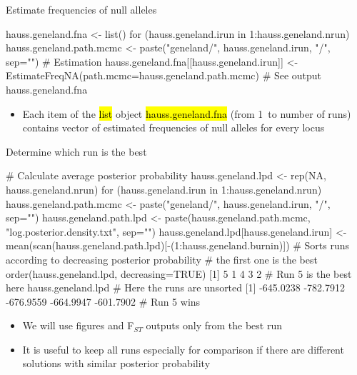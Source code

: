 \documentclass[compress, ucs, xelatex, 11pt, xcolor=svgnames,
	hyperref={
		bookmarks=true,
		unicode=true,
		colorlinks=true,
		pdftitle={Molecular data in R},
		plainpages=false,
		pdfauthor={Vojtech Zeisek},
		pdfsubject={Course about phylogeny and evolution in R},
		pdfcreator={XeLaTeX},
		pdfkeywords={R, evolution, phylogeny, molecular data},
		linkcolor=Tomato,
		anchorcolor=SaddleBrown,
		citecolor=Goldenrod,
		filecolor=DarkMagenta,
		menucolor=Sienna,
		urlcolor=DarkTurquoise,
		pdftex},
	url={hyphens, lowtilde} %
	]{beamer}
\renewcommand{\texttt}[1]{\hl{\ttfamily #1}}
\begin{document}
\begin{frame}[fragile]{Estimate frequencies of null alleles}
	\begin{spluscode}
    hauss.geneland.fna <- list()
    for (hauss.geneland.irun in 1:hauss.geneland.nrun) {
      hauss.geneland.path.mcmc <- paste("geneland/", hauss.geneland.irun,
        "/", sep="")
      # Estimation
      hauss.geneland.fna[[hauss.geneland.irun]] <-
        EstimateFreqNA(path.mcmc=hauss.geneland.path.mcmc)
      }
    # See output
    hauss.geneland.fna
	\end{spluscode}
	\begin{itemize}
		\item Each item of the \texttt{list} object \texttt{hauss.geneland.fna} (from 1~to number of runs) contains vector of estimated frequencies of null alleles for every locus
	\end{itemize}
\end{frame}

\begin{frame}[fragile]{Determine which run is the best}
	\begin{spluscode}
    # Calculate average posterior probability
    hauss.geneland.lpd <- rep(NA, hauss.geneland.nrun)
    for (hauss.geneland.irun in 1:hauss.geneland.nrun) {
      hauss.geneland.path.mcmc <- paste("geneland/",
        hauss.geneland.irun, "/", sep="")
      hauss.geneland.path.lpd <- paste(hauss.geneland.path.mcmc,
        "log.posterior.density.txt", sep="")
      hauss.geneland.lpd[hauss.geneland.irun] <-
        mean(scan(hauss.geneland.path.lpd)[-(1:hauss.geneland.burnin)]) }
    # Sorts runs according to decreasing posterior probability
    # the first one is the best
    order(hauss.geneland.lpd, decreasing=TRUE)
    [1] 5 1 4 3 2 # Run 5 is the best here
    hauss.geneland.lpd # Here the runs are unsorted
    [1] -645.0238 -782.7912 -676.9559 -664.9947 -601.7902 # Run 5 wins
	\end{spluscode}
	\begin{itemize}
		\item We will use figures and F$_{ST}$ outputs only from the best run
		\item It is useful to keep all runs especially for comparison if there are different solutions with similar posterior probability
	\end{itemize}
\end{frame}
\end{document}
